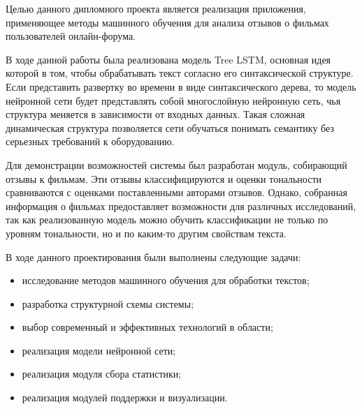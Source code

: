 Целью данного дипломного проекта является реализация приложения, применяющее методы машинного обучения для анализа отзывов о фильмах пользователей онлайн-форума.

В ходе данной работы была реализована модель Tree LSTM, основная идея которой в том, чтобы обрабатывать текст согласно его синтаксической структуре. Если представить развертку во времени в виде синтаксического дерева, то модель нейронной сети будет представлять собой многослойную нейронную сеть, чья структура меняется в зависимости от входных данных. Такая сложная динамическая структура позволяется сети обучаться понимать семантику без серьезных требований к оборудованию.

Для демонстрации возможностей системы был разработан модуль, собирающий отзывы к фильмам. Эти отзывы классифицируются и оценки тональности сравниваются с оценками поставленными авторами отзывов. Однако, собранная информация о фильмах предоставляет возможности для различных исследований, так как реализованную модель можно обучить классификации не только по уровням тональности, но и по каким-то другим свойствам текста.

В ходе данного проектирования были выполнены следующие задачи:
\begin{itemize}
\item исследование методов машинного обучения для обработки текстов;
\item разработка структурной схемы системы;
\item выбор современный и эффективных технологий в области;
\item реализация модели нейронной сети;
\item реализация модуля сбора статистики;
\item реализация модулей поддержки и визуализации.
\end{itemize}
